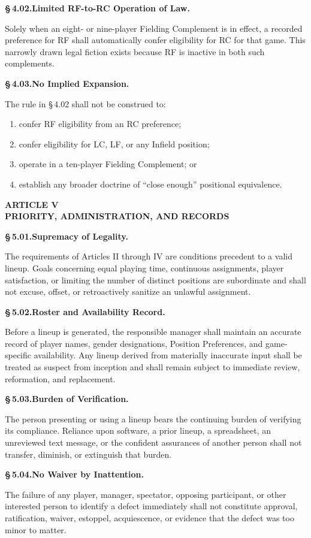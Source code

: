 \documentclass[11pt]{article}
\newcommand{\articleheading}[1]{%
  \vspace{6pt}
  \begin{center}
    \large\bfseries #1
  \end{center}
  \vspace{-3pt}
}
\newcommand{\sectionheading}[2]{%
  \vspace{4pt}
  \noindent\textbf{\S\,#1.\quad #2}\par
}
\begin{document}
\sectionheading{4.02}{Limited RF-to-RC Operation of Law.}
Solely when an eight- or nine-player Fielding Complement is in effect, a
recorded preference for RF shall automatically confer eligibility for RC for
that game. This narrowly drawn legal fiction exists because RF is inactive in
both such complements.

\sectionheading{4.03}{No Implied Expansion.}
The rule in \S\,4.02 shall not be construed to:
\begin{enumerate}[label=(\alph*)]
  \item confer RF eligibility from an RC preference;
  \item confer eligibility for LC, LF, or any Infield position;
  \item operate in a ten-player Fielding Complement; or
  \item establish any broader doctrine of ``close enough'' positional
  equivalence.
\end{enumerate}

\articleheading{ARTICLE V\\PRIORITY, ADMINISTRATION, AND RECORDS}

\sectionheading{5.01}{Supremacy of Legality.}
The requirements of Articles II through IV are conditions precedent to a valid
lineup. Goals concerning equal playing time, continuous assignments, player
satisfaction, or limiting the number of distinct positions are subordinate
and shall not excuse, offset, or retroactively sanitize an unlawful
assignment.

\sectionheading{5.02}{Roster and Availability Record.}
Before a lineup is generated, the responsible manager shall maintain an
accurate record of player names, gender designations, Position Preferences,
and game-specific availability. Any lineup derived from materially inaccurate
input shall be treated as suspect from inception and shall remain subject to
immediate review, reformation, and replacement.

\sectionheading{5.03}{Burden of Verification.}
The person presenting or using a lineup bears the continuing burden of
verifying its compliance. Reliance upon software, a prior lineup, a
spreadsheet, an unreviewed text message, or the confident assurances of
another person shall not transfer, diminish, or extinguish that burden.

\sectionheading{5.04}{No Waiver by Inattention.}
The failure of any player, manager, spectator, opposing participant, or other
interested person to identify a defect immediately shall not constitute
approval, ratification, waiver, estoppel, acquiescence, or evidence that the
defect was too minor to matter.
\end{document}
